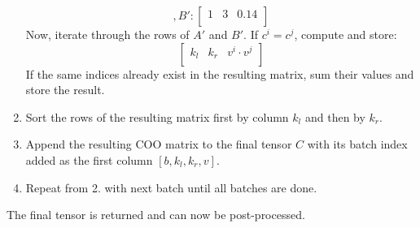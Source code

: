 \begin{enumerate}[label*=\arabic*.]
\begin{equation*}
              , B':
              \begin{bmatrix}
                  1 & 3 & 0.14 \\
              \end{bmatrix}
          \end{equation*}
          Now, iterate through the rows of $A'$ and $B'$. If $c^i = c^j$, compute and store:
          \begin{equation*}
              \begin{bmatrix}
                  k_l & k_r & v^i \cdot v^j \\
              \end{bmatrix}
          \end{equation*}
          If the same indices already exist in the resulting matrix, sum their values and store the result.
    \item Sort the rows of the resulting matrix first by column $k_l$ and then by $k_r$.
    \item Append the resulting COO matrix to the final tensor $C$ with its batch index added as the
          first column $[b, k_l, k_r, v]$.
    \item Repeat from 2. with next batch until all batches are done.
\end{enumerate}
The final tensor is returned and can now be post-processed.


